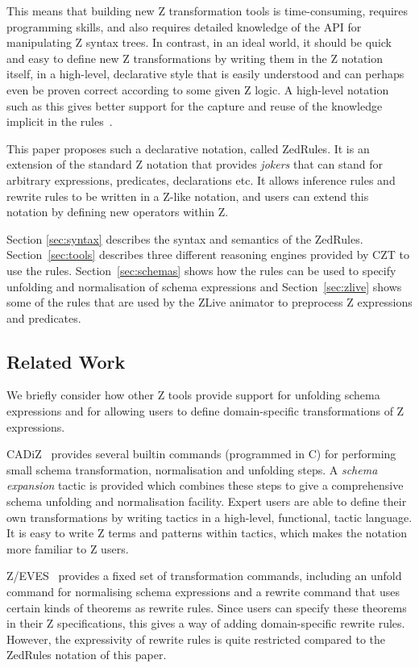 \documentclass{entcs}
\begin{document}
This means that building new Z transformation tools is time-consuming,
requires programming skills, and also requires detailed knowledge of the
API for manipulating Z syntax trees.  In contrast, in an ideal world, it
should be quick and easy to define new Z transformations by writing them in
the Z notation itself, in a high-level, declarative style that is easily
understood and can perhaps even be proven correct according to some given Z
logic.  A high-level notation such as this gives better support for the
capture and reuse of the knowledge implicit in the
rules~\cite{armour:business-model00}.

This paper proposes such a declarative notation, called ZedRules.  It
is an extension of the standard Z notation that provides \emph{jokers}
that can stand for arbitrary expressions, predicates, declarations
etc.  It allows inference rules and rewrite rules to be written in a
Z-like notation, and users can extend this notation by defining new
operators within Z.

Section \ref{sec:syntax} describes the syntax and semantics of the
ZedRules.  Section~\ref{sec:tools} describes three different reasoning
engines provided by CZT to use the rules.  Section~\ref{sec:schemas} shows
how the rules can be used to specify unfolding and normalisation of schema
expressions and Section~\ref{sec:zlive} shows some of the rules that are
used by the ZLive animator to preprocess Z expressions and predicates.


\subsection{Related Work} \label{sec:relwork}

We briefly consider how other Z tools provide support for unfolding
schema expressions and for allowing users to define domain-specific
transformations of Z expressions.

CADiZ~\cite{cadiz:refman02} provides several builtin commands
(programmed in C) for performing small schema transformation,
normalisation and unfolding steps.  A \emph{schema expansion} tactic
is provided which combines these steps to give a comprehensive schema
unfolding and normalisation facility.  Expert users are able to define
their own transformations by writing tactics in a high-level,
functional, tactic language.  It is easy to write Z terms and patterns
within tactics, which makes the notation more familiar to Z users.

Z/EVES~\cite{zeves:98} provides a fixed set of transformation
commands, including an unfold command for normalising schema
expressions and a rewrite command that uses certain kinds of theorems
as rewrite rules.  Since users can specify these theorems in their Z
specifications, this gives a way of adding domain-specific rewrite
rules.  However, the expressivity of rewrite rules is quite restricted
compared to the ZedRules notation of this paper.
\end{document}
